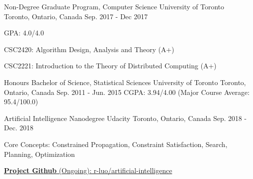 
\begin{cventries}

  \cventry
    {Non-Degree Graduate Program, Computer Science} %
    {University of Toronto} %
    {Toronto, Ontario, Canada} %
    {Sep. 2017 - Dec 2017} %
    {GPA: 4.0/4.0\newline \hphantom{0}
      \begin{cvitems}
        \item {CSC2420: Algorithm Design, Analysis and Theory (A+)}
        \item {CSC2221: Introduction to the Theory of Distributed Computing (A+)}
      \end{cvitems}
    }
\end{cventries}
\begin{cventries}
  \cventry
    {Honours Bachelor of Science, Statistical Sciences} %
    {University of Toronto} %
    {Toronto, Ontario, Canada} %
    {Sep. 2011 - Jun. 2015} %
    {CGPA: 3.94/4.00 (Major Course Average: 95.4/100.0)}
\end{cventries}

\begin{cventries}

  \cventry
    {Artificial Intelligence Nanodegree} %
    {Udacity} %
    {Toronto, Ontario, Canada} %
    {Sep. 2018 - Dec. 2018} %
    {
      \begin{cvitems}
        \item {Core Concepts: Constrained Propagation, Constraint Satisfaction, Search, Planning, Optimization}
        \item \href{https://github.com/r-luo/artificial-intelligence}{\textbf{Project Github} (Ongoing): r-luo/artificial-intelligence}
      \end{cvitems}
    }
\end{cventries}